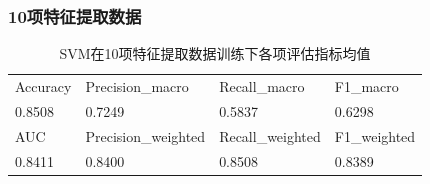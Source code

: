 \documentclass[10pt]{article}
\begin{document}
\subsubsection*{10项特征提取数据}
\begin{table}[H]
  \centering
  \caption{SVM在10项特征提取数据训练下各项评估指标均值}
  \begin{tabular}{llll}
  \toprule
  Accuracy & Precision\_macro & Recall\_macro & F1\_macro \\
  0.8508 & 0.7249 & 0.5837 & 0.6298 \\
  \midrule
  AUC & Precision\_weighted & Recall\_weighted & F1\_weighted \\
  0.8411 & 0.8400 & 0.8508 & 0.8389 \\
  \bottomrule
  \end{tabular}
\end{table}
\end{document}
